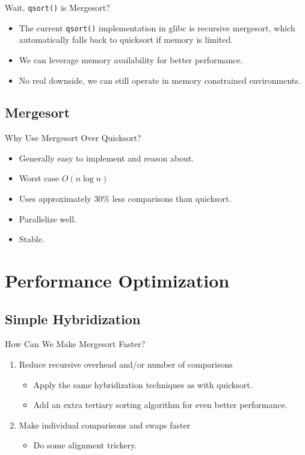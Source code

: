 \documentclass[13pt]{beamer}
\begin{document}
\begin{frame}{Wait, \texttt{qsort()} is Mergesort?}
	\pause
	\begin{itemize}[<+->]
		\item The current \texttt{qsort()} implementation in glibc is recursive
		      mergesort, which automatically falls back to quicksort if memory is
		      limited.
		\item We can leverage memory availability for better performance.
		\item No real downside, we can still operate in memory constrained environments.
	\end{itemize}
\end{frame}

\subsection{Mergesort}
\begin{frame}{Why Use Mergesort Over Quicksort?}
	\pause
	\begin{itemize}[<+->]
		\item Generally easy to implement and reason about.
		\item Worst case $O(n\log{n})$
		\item Uses approximately 30\% less comparisons than quicksort.
		\item Parallelize well.
		\item Stable.
	\end{itemize}
\end{frame}

\section{Performance Optimization}
\subsection{Simple Hybridization}
\begin{frame}{How Can We Make Mergesort Faster?}
	\begin{enumerate}
		\item\pause Reduce recursive overhead and/or number of comparisons
		\begin{itemize}
			\item Apply the same hybridization techniques as with quicksort.
			\item Add an extra tertiary sorting algorithm for even better performance.
		\end{itemize}
		\item\pause Make individual comparisons and swaps faster
		\begin{itemize}[]
			\item Do some alignment trickery.
		\end{itemize}
	\end{enumerate}
\end{frame}
\end{document}
